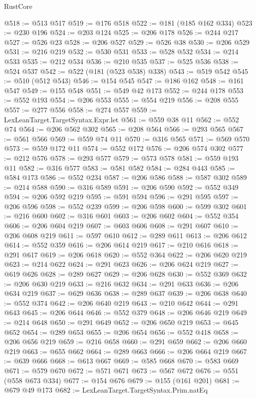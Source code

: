 \begin{lexlean}{RustCore}
\begin{coremodule}
@518 := @513 @517
@519 := @176 @518
@522 := @181 (@185 @162 @334)
@523 := @230 @196
@524 := @203 @124
@525 := @206 @178
@526 := @244 @217
@527 := @526 @23
@528 := @206 @527
@529 := @526 @38
@530 := @206 @529
@531 := @216 @219
@532 := @530 @531
@533 := @528 @532
@534 := @214 @533
@535 := @212 @534
@536 := @210 @535
@537 := @525 @536
@538 := @524 @537
@542 := @522 (@181 (@523 @538) @338)
@543 := @519 @542
@545 := @510 (@512 @543)
@546 := @154 @545
@547 := @186 @162
@548 := @161 @547
@549 := @155 @548
@551 := @549 @42 @173
@552 := @244 @178
@553 := @552 @193
@554 := @206 @553
@555 := @554 @219
@556 := @208 @555
@557 := @277 @556
@558 := @274 @557
@559 := LexLeanTarget.TargetSyntax.Expr.let
@561 := @559 @38 @11
@562 := @552 @74
@564 := @206 @562 @302
@565 := @208 @564
@566 := @293 @565
@567 := @561 @566
@569 := @559 @74 @11
@570 := @316 @565
@571 := @569 @570
@573 := @559 @172 @11
@574 := @552 @172
@576 := @206 @574 @302
@577 := @212 @576
@578 := @293 @577
@579 := @573 @578
@581 := @559 @193 @11
@582 := @316 @577
@583 := @581 @582
@584 := @284 @443
@585 := @584 @173
@586 := @552 @234
@587 := @206 @586
@588 := @587 @302
@589 := @214 @588
@590 := @316 @589
@591 := @206 @590
@592 := @552 @349
@594 := @206 @592 @219
@595 := @591 @594
@596 := @291 @595
@597 := @206 @596
@598 := @552 @239
@599 := @206 @598
@600 := @599 @302
@601 := @216 @600
@602 := @316 @601
@603 := @206 @602
@604 := @552 @354
@606 := @206 @604 @219
@607 := @603 @606
@608 := @291 @607
@610 := @206 @608 @219
@611 := @597 @610
@612 := @289 @611
@613 := @206 @612
@614 := @552 @359
@616 := @206 @614 @219
@617 := @210 @616
@618 := @291 @617
@619 := @206 @618
@620 := @552 @364
@622 := @206 @620 @219
@623 := @214 @622
@624 := @291 @623
@626 := @206 @624 @219
@627 := @619 @626
@628 := @289 @627
@629 := @206 @628
@630 := @552 @369
@632 := @206 @630 @219
@633 := @216 @632
@634 := @291 @633
@636 := @206 @634 @219
@637 := @629 @636
@638 := @289 @637
@639 := @206 @638
@640 := @552 @374
@642 := @206 @640 @219
@643 := @210 @642
@644 := @291 @643
@645 := @206 @644
@646 := @552 @379
@648 := @206 @646 @219
@649 := @214 @648
@650 := @291 @649
@652 := @206 @650 @219
@653 := @645 @652
@654 := @289 @653
@655 := @206 @654
@656 := @552 @418
@658 := @206 @656 @219
@659 := @216 @658
@660 := @291 @659
@662 := @206 @660 @219
@663 := @655 @662
@664 := @289 @663
@666 := @206 @664 @219
@667 := @639 @666
@668 := @613 @667
@669 := @585 @668
@670 := @583 @669
@671 := @579 @670
@672 := @571 @671
@673 := @567 @672
@676 := @551 (@558 @673 @334)
@677 := @154 @676
@679 := @155 (@161 @201)
@681 := @679 @49 @173
@682 := LexLeanTarget.TargetSyntax.Prim.natEq

\end{coremodule}
\end{lexlean}
